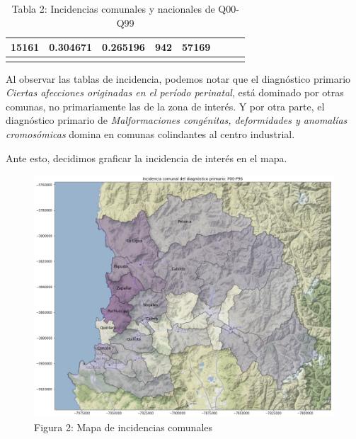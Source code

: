 \documentclass[]{article}
\begin{document}
\begin{longtable}[]{@{}llllllll@{}}
\begin{minipage}[t]{0.13\columnwidth}
15161\strut
\end{minipage} & \begin{minipage}[t]{0.10\columnwidth}\raggedright
0.304671\strut
\end{minipage} & \begin{minipage}[t]{0.09\columnwidth}\raggedright
0.265196\strut
\end{minipage} & \begin{minipage}[t]{0.10\columnwidth}\raggedright
942\strut
\end{minipage} & \begin{minipage}[t]{0.10\columnwidth}\raggedright
57169\strut
\end{minipage}\tabularnewline
\bottomrule
\caption{Tabla 2: Incidencias comunales y nacionales de Q00-Q99}
\end{longtable}

Al observar las tablas de incidencia, podemos notar que el diagnóstico
primario \emph{Ciertas afecciones originadas en el período perinatal},
está dominado por otras comunas, no primariamente las de la zona de
interés. Y por otra parte, el diagnóstico primario de
\emph{Malformaciones congénitas, deformidades y anomalías cromosómicas}
domina en comunas colindantes al centro industrial.

Ante esto, decidimos graficar la incidencia de interés en el mapa.

\begin{figure}
\centering
\includegraphics{assets/mapa.png}
\caption{Figura 2: Mapa de incidencias comunales}
\end{figure}
\end{document}
